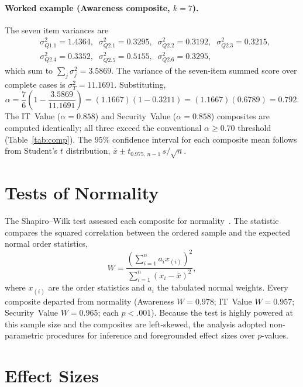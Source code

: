 \paragraph{Worked example (Awareness composite, $k=7$).} The seven item variances are
\begin{equation}
\begin{aligned}
  &\sigma^2_{Q1.1}=1.4364,\;\; \sigma^2_{Q2.1}=0.3295,\;\; \sigma^2_{Q2.2}=0.3192,\;\; \sigma^2_{Q2.3}=0.3215,\\
  &\sigma^2_{Q2.4}=0.3352,\;\; \sigma^2_{Q2.5}=0.5155,\;\; \sigma^2_{Q2.6}=0.3295,
\end{aligned}
\end{equation}
which sum to $\sum_j \sigma^2_j = 3.5869$. The variance of the seven-item summed score over complete cases is $\sigma^2_{T}=11.1691$. Substituting,
\begin{equation}
  \alpha = \frac{7}{6}\left(1-\frac{3.5869}{11.1691}\right)
         = (1.1667)(1-0.3211) = (1.1667)(0.6789) = 0.792 .
\end{equation}
The IT~Value ($\alpha=0.858$) and Security~Value ($\alpha=0.858$) composites are computed identically; all three exceed the conventional $\alpha\ge0.70$ threshold (Table~\ref{tab:comp}). The $95\%$ confidence interval for each composite mean follows from Student's $t$ distribution, $\bar{x}\pm t_{0.975,\,n-1}\,s/\sqrt{n}$.

\section{Tests of Normality}

The Shapiro--Wilk test assessed each composite for normality~\parencite{Shapiro_Wilk_1965}. The statistic compares the squared correlation between the ordered sample and the expected normal order statistics,
\begin{equation}
  W = \frac{\left(\sum_{i=1}^{n} a_i x_{(i)}\right)^2}{\sum_{i=1}^{n}\left(x_i-\bar{x}\right)^2},
\end{equation}
where $x_{(i)}$ are the order statistics and $a_i$ the tabulated normal weights. Every composite departed from normality (Awareness $W=0.978$; IT~Value $W=0.957$; Security~Value $W=0.965$; each $p<.001$). Because the test is highly powered at this sample size and the composites are left-skewed, the analysis adopted non-parametric procedures for inference and foregrounded effect sizes over $p$-values.

\section{Effect Sizes}

